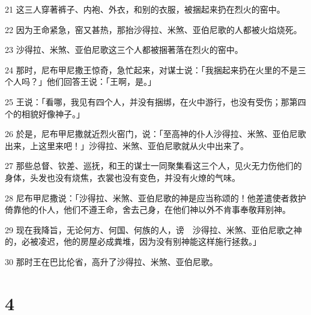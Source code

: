 \par 21 这三人穿著裤子、内袍、外衣，和别的衣服，被捆起来扔在烈火的窑中。
\par 22 因为王命紧急，窑又甚热，那抬沙得拉、米煞、亚伯尼歌的人都被火焰烧死。
\par 23 沙得拉、米煞、亚伯尼歌这三个人都被捆著落在烈火的窑中。
\par 24 那时，尼布甲尼撒王惊奇，急忙起来，对谋士说：「我捆起来扔在火里的不是三个人吗？」他们回答王说：「王啊，是。」
\par 25 王说：「看哪，我见有四个人，并没有捆绑，在火中游行，也没有受伤；那第四个的相貌好像神子。」
\par 26 於是，尼布甲尼撒就近烈火窑门，说：「至高神的仆人沙得拉、米煞、亚伯尼歌出来，上这里来吧！」沙得拉、米煞、亚伯尼歌就从火中出来了。
\par 27 那些总督、钦差、巡抚，和王的谋士一同聚集看这三个人，见火无力伤他们的身体，头发也没有烧焦，衣裳也没有变色，并没有火燎的气味。
\par 28 尼布甲尼撒说：「沙得拉、米煞、亚伯尼歌的神是应当称颂的！他差遣使者救护倚靠他的仆人，他们不遵王命，舍去己身，在他们神以外不肯事奉敬拜别神。
\par 29 现在我降旨，无论何方、何国、何族的人，谤　沙得拉、米煞、亚伯尼歌之神的，必被凌迟，他的房屋必成粪堆，因为没有别神能这样施行拯救。」
\par 30 那时王在巴比伦省，高升了沙得拉、米煞、亚伯尼歌。

\chapter{4}

